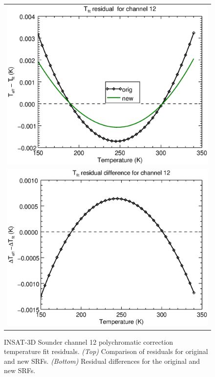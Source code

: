 \begin{figure}[H]
  \centering
  \begin{tabular}{c}
    \includegraphics[scale=0.55]{graphics/sndr/tfit/sndr_insat3d-12.tfit.eps} \\
    \includegraphics[scale=0.55]{graphics/sndr/tfit/sndr_insat3d-12.tfit.difference.eps}
  \end{tabular}
  \caption{INSAT-3D Sounder channel 12 polychromatic correction temperature fit residuals. \emph{(Top)} Comparison of residuals for original and new SRFs. \emph{(Bottom)} Residual differences for the original and new SRFs.}
  \label{fig:sndr_ch12_tfit}
\end{figure}



